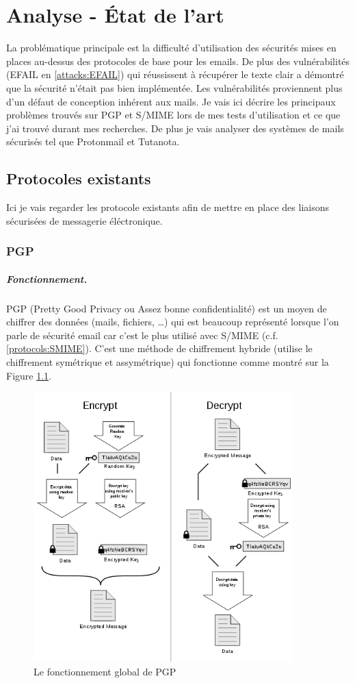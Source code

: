 \chapter{Analyse - État de l'art}
\label{ch:analysis}
\noindent La problématique principale est la difficulté d’utilisation des sécurités mises en places au-dessus des protocoles de base pour les emails. 
De plus des vulnérabilités (EFAIL en \ref{attacks:EFAIL}) qui réussissent à récupérer le texte clair a démontré que la sécurité n’était pas bien implémentée. Les vulnérabilités proviennent plus d'un défaut de conception inhérent aux mails.
Je vais ici décrire les principaux problèmes trouvés sur PGP et S/MIME lors de mes tests d’utilisation et ce que j’ai trouvé durant mes recherches. De plus je vais analyser des systèmes de mails sécurisés tel que Protonmail et Tutanota.
\section{Protocoles existants}
Ici je vais regarder les protocole existants afin de mettre en place des liaisons sécurisées de messagerie éléctronique.
\subsection{PGP}
\paragraph*{Fonctionnement.}
PGP (Pretty Good Privacy ou Assez bonne confidentialité) est un moyen de chiffrer des données (mails, fichiers, …) qui est beaucoup représenté lorsque l’on parle de sécurité email car c’est le plus utilisé avec S/MIME (c.f. \ref{protocols:SMIME}). C’est une méthode de chiffrement hybride (utilise le chiffrement symétrique et assymétrique) qui fonctionne comme montré sur la Figure \ref{fig:PGP_101}.

\begin{figure}[h!]
\includegraphics[width=10cm]{images/PGP_101.png}
\centering
\caption{Le fonctionnement global de PGP}
\label{fig:PGP_101}
\end{figure}

